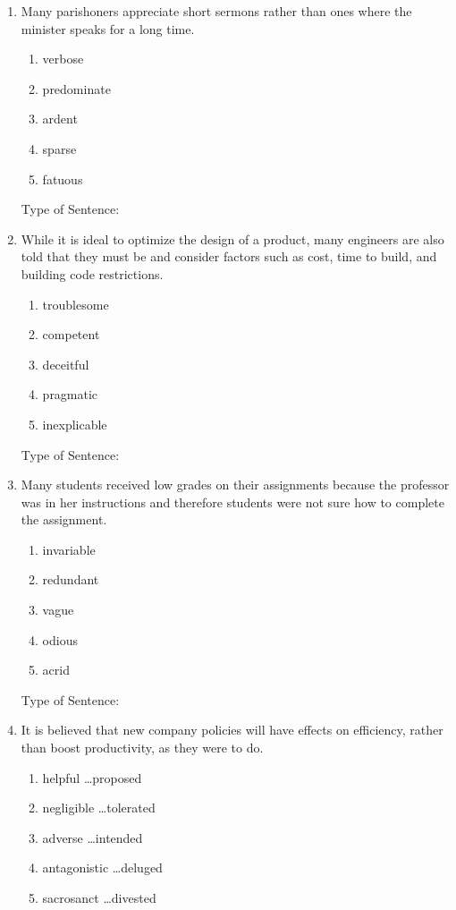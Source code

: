 \begin{enumerate}

\item Many parishoners appreciate short sermons rather than \longline ones where the minister speaks for a long time. 
\begin{enumerate}[label=(\Alph*)]
\item verbose
\item predominate 
\item ardent 
\item sparse
\item fatuous 
\end{enumerate}

Type of Sentence:\hrulefill

\bigskip
\item While it is ideal to optimize the design of a product, many engineers are also told that they must be \longline and consider factors such as cost, time to build, and building code restrictions. 
\begin{enumerate}[label=(\Alph*)]
\item troublesome
\item competent 
\item deceitful
\item pragmatic
\item inexplicable
\end{enumerate}

Type of Sentence:\hrulefill

\bigskip
\item Many students received low grades on their assignments because the professor was \longline in her instructions and therefore students were not sure how to complete the assignment. 
\begin{enumerate}[label=(\Alph*)]
\item invariable
\item redundant
\item vague
\item odious
\item acrid
\end{enumerate}

Type of Sentence:\hrulefill

\bigskip
\item It is believed that new company policies will have \longline effects on efficiency, rather than boost productivity, as they were \longline to do. 
\begin{enumerate}[label=(\Alph*)]
\item helpful \ldots proposed
\item negligible \ldots tolerated
\item adverse \ldots intended
\item antagonistic \ldots deluged 
\item sacrosanct \ldots divested 
\end{enumerate}


\end{enumerate}
